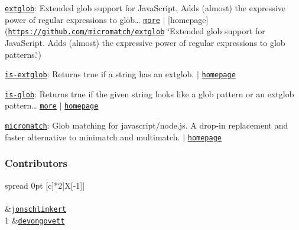 \begin{DoxyItemize}
\item \href{https://www.npmjs.com/package/extglob}{\tt extglob}\+: Extended glob support for Java\+Script. Adds (almost) the expressive power of regular expressions to glob… \href{https://github.com/micromatch/extglob}{\tt more} $\vert$ \mbox{[}homepage\mbox{]}(\href{https://github.com/micromatch/extglob}{\tt https\+://github.\+com/micromatch/extglob} \char`\"{}\+Extended glob support for Java\+Script. Adds (almost) the expressive power of regular expressions to glob patterns.\char`\"{})
\item \href{https://www.npmjs.com/package/is-extglob}{\tt is-\/extglob}\+: Returns true if a string has an extglob. $\vert$ \href{https://github.com/jonschlinkert/is-extglob}{\tt homepage}
\item \href{https://www.npmjs.com/package/is-glob}{\tt is-\/glob}\+: Returns {\ttfamily true} if the given string looks like a glob pattern or an extglob pattern… \href{https://github.com/jonschlinkert/is-glob}{\tt more} $\vert$ \href{https://github.com/jonschlinkert/is-glob}{\tt homepage}
\item \href{https://www.npmjs.com/package/micromatch}{\tt micromatch}\+: Glob matching for javascript/node.\+js. A drop-\/in replacement and faster alternative to minimatch and multimatch. $\vert$ \href{https://github.com/micromatch/micromatch}{\tt homepage}
\end{DoxyItemize}

\subsubsection*{Contributors}

\tabulinesep=1mm
\begin{longtabu} spread 0pt [c]{*{2}{|X[-1]}|}
\hline
\rowcolor{\tableheadbgcolor}\\
\endfirsthead
\hline
\endfoot
\hline
\rowcolor{\tableheadbgcolor}\\
  &\href{https://github.com/jonschlinkert}{\tt jonschlinkert}   \\
1  &\href{https://github.com/devongovett}{\tt devongovett}   \\
\end{longtabu}


